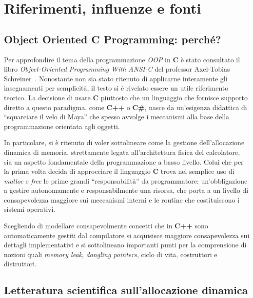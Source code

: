 \chapter{Riferimenti, influenze e fonti}
\section{Object Oriented C Programming: perché?}

Per approfondire il tema della programmazione \textit{OOP} in \textbf{C} è stato consultato il libro \textit{Object-Oriented Programming With ANSI-C} del professor Axel-Tobias Schreiner~\cite{schreiner1994}. Nonostante non sia stato ritenuto di applicarne interamente gli insegnamenti per semplicità, il testo si è rivelato essere un utile riferimento teorico. La decisione di usare \textbf{C} piuttosto che un linguaggio che fornisce supporto diretto a questo paradigma, come \textbf{C++} o \textbf{C\#}, nasce da un’esigenza didattica di ``squarciare il velo di Maya'' che spesso avvolge i meccanismi alla base della programmazione orientata agli oggetti.

In particolare, si è ritenuto di voler sottolineare come la gestione dell’allocazione dinamica di memoria, strettamente legata all’architettura fisica del calcolatore, sia un aspetto fondamentale della programmazione a basso livello. Colui che per la prima volta decida di approcciare il linguaggio \textbf{C} trova nel semplice uso di \textit{malloc} e \textit{free} le prime grandi ``responsabilità'' da programmatore: un’obbligazione a gestire autonomamente e responsabilmente una risorsa, che porta a un livello di consapevolezza maggiore sui meccanismi interni e le routine che costituiscono i sistemi operativi.

Scegliendo di modellare consapevolmente concetti che in \textbf{C++} sono automaticamente gestiti dal compilatore si acquisisce maggiore consapevolezza sui dettagli implementativi e si sottolineano importanti punti per la comprensione di nozioni quali \textit{memory leak}, \textit{dangling pointers}, ciclo di vita, costruttori e distruttori.

\section{Letteratura scientifica sull’allocazione dinamica}

